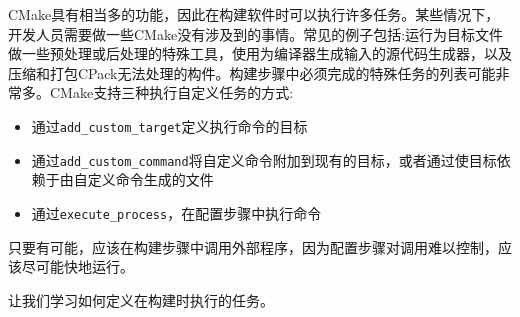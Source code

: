 CMake具有相当多的功能，因此在构建软件时可以执行许多任务。某些情况下，开发人员需要做一些CMake没有涉及到的事情。常见的例子包括:运行为目标文件做一些预处理或后处理的特殊工具，使用为编译器生成输入的源代码生成器，以及压缩和打包CPack无法处理的构件。构建步骤中必须完成的特殊任务的列表可能非常多。CMake支持三种执行自定义任务的方式:

\begin{itemize}
\item 
通过\texttt{add\_custom\_target}定义执行命令的目标

\item 
通过\texttt{add\_custom\_command}将自定义命令附加到现有的目标，或者通过使目标依赖于由自定义命令生成的文件

\item 
通过\texttt{execute\_process}，在配置步骤中执行命令
\end{itemize}

只要有可能，应该在构建步骤中调用外部程序，因为配置步骤对调用难以控制，应该尽可能快地运行。

让我们学习如何定义在构建时执行的任务。